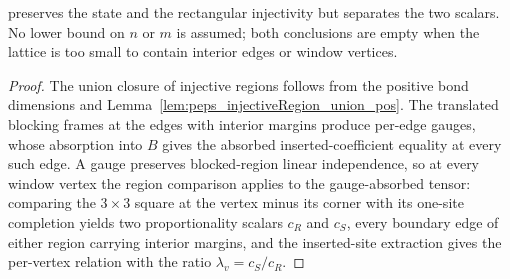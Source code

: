 \begin{theorem}
    preserves the state and the rectangular injectivity but separates the two
    scalars. No lower bound on $n$ or $m$ is assumed; both conclusions are
    empty when the lattice is too small to contain interior edges or window
    vertices.
    \begin{proof}
        \leanok
        The union closure of injective regions follows from the positive bond
        dimensions and Lemma~\ref{lem:peps_injectiveRegion_union_pos}. The
        translated blocking frames at the edges with interior margins produce
        per-edge gauges, whose absorption into $B$ gives the absorbed
        inserted-coefficient equality at every such edge. A gauge preserves
        blocked-region linear independence, so at every window vertex the
        region comparison applies to the gauge-absorbed tensor: comparing the
        $3\times 3$ square at the vertex minus its corner with its one-site
        completion yields two proportionality scalars $c_R$ and $c_S$, every
        boundary edge of either region carrying interior margins, and the
        inserted-site extraction gives the per-vertex relation with the ratio
        $\lambda_v = c_S/c_R$.
    \end{proof}
\end{theorem}
